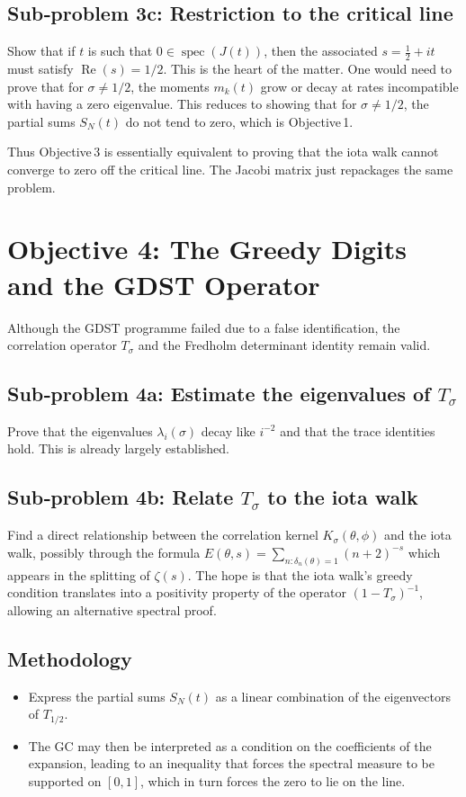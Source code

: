 \documentclass[11pt,a4paper]{article}
\begin{document}
\subsection{Sub‑problem 3c: Restriction to the critical line}
Show that if $t$ is such that $0\in\operatorname{spec}(J(t))$, then the associated $s=\frac12+it$ must satisfy $\operatorname{Re}(s)=1/2$.  This is the heart of the matter.  One would need to prove that for $\sigma\neq 1/2$, the moments $m_k(t)$ grow or decay at rates incompatible with having a zero eigenvalue.  This reduces to showing that for $\sigma\neq 1/2$, the partial sums $S_N(t)$ do not tend to zero, which is Objective 1.

Thus Objective 3 is essentially equivalent to proving that the iota walk cannot converge to zero off the critical line.  The Jacobi matrix just repackages the same problem.

\section{Objective 4: The Greedy Digits and the GDST Operator}
\label{sec:greedy-op}

Although the GDST programme failed due to a false identification, the correlation operator $T_\sigma$ and the Fredholm determinant identity remain valid.  

\subsection{Sub‑problem 4a: Estimate the eigenvalues of $T_\sigma$}
Prove that the eigenvalues $\lambda_i(\sigma)$ decay like $i^{-2}$ and that the trace identities hold.  This is already largely established.

\subsection{Sub‑problem 4b: Relate $T_\sigma$ to the iota walk}
Find a direct relationship between the correlation kernel $K_\sigma(\theta,\phi)$ and the iota walk, possibly through the formula $E(\theta,s)=\sum_{n:\delta_n(\theta)=1}(n+2)^{-s}$ which appears in the splitting of $\zeta(s)$.  The hope is that the iota walk’s greedy condition translates into a positivity property of the operator $(1-T_\sigma)^{-1}$, allowing an alternative spectral proof.

\subsection{Methodology}
\begin{itemize}
    \item Express the partial sums $S_N(t)$ as a linear combination of the eigenvectors of $T_{1/2}$.
    \item The GC may then be interpreted as a condition on the coefficients of the expansion, leading to an inequality that forces the spectral measure to be supported on $[0,1]$, which in turn forces the zero to lie on the line.
\end{itemize}
\end{document}
